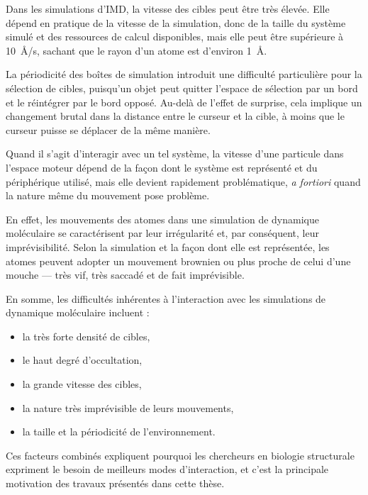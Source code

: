 	
	Dans les simulations d'IMD, la vitesse des cibles peut être très élevée. Elle dépend en pratique de la vitesse de la simulation, donc de la taille du système simulé et des ressources de calcul disponibles, mais elle peut être supérieure à 10~\r{A}/s, sachant que le rayon d'un atome est d'environ 1~\r{A}.
	
	La périodicité des \og boîtes \fg{} de simulation introduit une difficulté particulière pour la sélection de cibles, puisqu'un objet peut quitter l'espace de sélection par un bord et le réintégrer par le bord opposé. Au-delà de l'effet de surprise, cela implique un changement brutal dans la distance entre le curseur et la cible, à moins que le curseur puisse se déplacer de la même manière.
	
	Quand il s'agit d'interagir avec un tel système, la vitesse d'une particule dans l'espace moteur dépend de la façon dont le système est représenté et du périphérique utilisé, mais elle devient rapidement problématique, \emph{a fortiori} quand la nature même du mouvement pose problème.
	
	En effet, les mouvements des atomes dans une simulation de dynamique moléculaire se caractérisent par leur irrégularité et, par conséquent, leur imprévisibilité. Selon la simulation et la façon dont elle est représentée, les atomes peuvent adopter un mouvement brownien ou plus proche de celui d'une mouche --- très vif, très saccadé et de fait imprévisible.
	
	En somme, les difficultés inhérentes à l'interaction avec les simulations de dynamique moléculaire incluent :
	
	\begin{itemize}
		\item la très forte densité de cibles,
		\item le haut degré d'occultation,
		\item la grande vitesse des cibles,
		\item la nature très imprévisible de leurs mouvements,
		\item la taille et la périodicité de l'environnement.
	\end{itemize}
	
	Ces facteurs combinés expliquent pourquoi les chercheurs en biologie structurale expriment le besoin de meilleurs modes d'interaction, et c'est la principale motivation des travaux présentés dans cette thèse.
	
